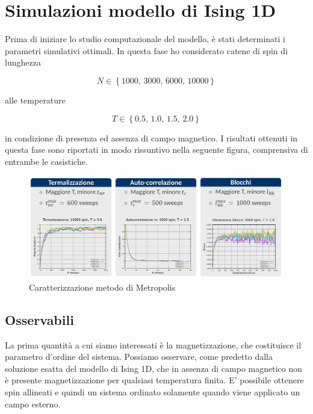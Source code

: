 \section{Simulazioni modello di Ising 1D}

Prima di iniziare lo studio computazionale del modello, è stati determinati i parametri simulativi ottimali. In questa fase ho 
considerato catene di spin di lunghezza 

$$
N \in \left\{1000,\,3000,\,6000,\,10000\right\}
$$

alle temperature

$$
T \in \left\{0.5,\,1.0,\,1.5,\,2.0\right\}
$$

in condizione di presenza ed assenza di campo magnetico. I risultati ottenuti in questa fase sono riportati in modo rissuntivo 
nella seguente figura, comprensiva di entrambe le casistiche. 

\begin{figure}[H]
    \centering
    \includegraphics[width=\textwidth]{Immagini/simIsing1D/carMetro.png}
    \caption{Caratterizzazione metodo di Metropolis}
    \label{fig: car_Ising1D}
\end{figure}



\subsection{Osservabili}

La prima quantità a cui siamo interessati è la magnetizzazione, che costituisce il parametro d'ordine del 
sistema. Possiamo osservare, come predetto dalla soluzione esatta del modello di Ising 1D, che in assenza di 
campo magnetico non è presente magnetizzazione per qualsiasi temperatura finita. E' possibile ottenere spin allineati e quindi un 
sistema ordinato solamente quando viene applicato un campo esterno.

